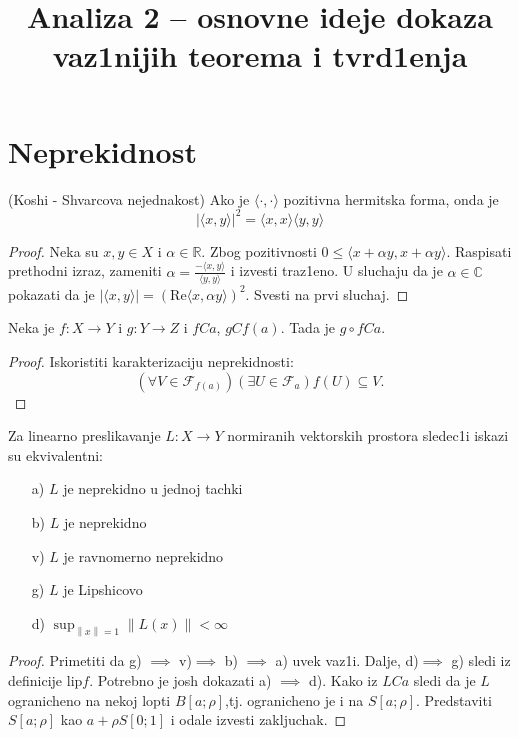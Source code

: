 \documentclass[a4paper,12pt]{article}
\title{\textbf{Analiza 2 -- osnovne ideje dokaza vaz1nijih teorema i tvrd1enja }}
\date{}
\newcommand{\RR}{\mathbb{R}}
\newcommand{\CC}{\mathbb{C}}
\newcommand{\psj}{\subseteq}
\newcommand{\norm}[1]{\left\lVert#1\right\rVert}
\begin{document}
\maketitle

\section{Neprekidnost}

\begin{tvr}
(Koshi - Shvarcova nejednakost) Ako je $\langle \cdot, \cdot \rangle$ pozitivna hermit\-ska forma, onda je 
\[{|\langle x, y \rangle |}^2 = \langle x, x \rangle \langle y, y \rangle\]
\end{tvr}
\begin{proof}
Neka su $x, y \in X$ i $\alpha \in \RR$. Zbog pozitivnosti $0 \leq \langle x + \alpha y, x + \alpha y \rangle$. Raspisati prethodni izraz, zameniti $\alpha = \frac{- \langle x, y \rangle }{\langle y, y \rangle}$ i izvesti traz1eno. U sluchaju da je $\alpha \in \CC$ pokazati da je $|\langle x, y \rangle | = {( \mathrm{Re} \langle x, \alpha y \rangle)}^2$. Svesti na prvi sluchaj.
\end{proof}

\begin{tvr}
	Neka je $f:X\to Y$ i $g: Y\to Z$ i $f C a$, $g C f(a)$. Tada je $g\circ f C a$.
\end{tvr}
\begin{proof}
	Iskoristiti karakterizaciju neprekidnosti:
	\[ (\forall V \in \mathcal F_{f(a)})(\exists U \in \mathcal F_{a}) f(U)\psj V .\]
\end{proof}

\begin{tvr}
Za linearno preslikavanje $L:X \to Y$ normiranih vektorskih prostora sledec1i iskazi su ekvivalentni:
\begin{itemize}
\item[a)] $L$ je neprekidno u jednoj tachki
\item[b)] $L$ je neprekidno
\item[v)] $L$ je ravnomerno neprekidno
\item[g)] $L$ je Lipshicovo
\item[d)] $\sup_{\norm{x} = 1} \norm{L(x)} < \infty$
\end{itemize}
\end{tvr}
\begin{proof}
Primetiti da g) $\implies$ v)$ \implies$ b) $ \implies$ a) uvek vaz1i. Dalje, d)$ \implies$ g) sledi iz definicije $\mathrm{lip} f$. Potrebno je josh dokazati a) $\implies$ d). Kako iz $LCa$ sledi da je $L$ ogranicheno na nekoj lopti $B[a; \rho]$,tj. ogranicheno je i na $S[a; \rho]$. Predstaviti $S[a;\rho]$ kao $a + \rho S[0;1]$ i odale izvesti zakljuchak.
\end{proof}
\end{document}

